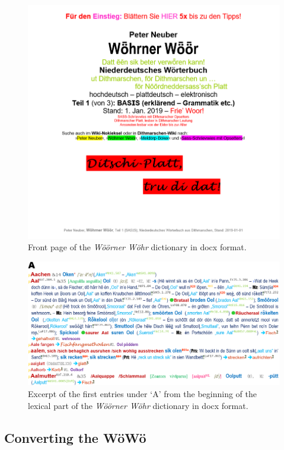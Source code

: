 \begin{figure}
    \centering
    \includegraphics[width=1\linewidth]{img/woewoe_cover.png}
    \caption{Front page of the \emph{Wöörner Wöhr} dictionary in docx format.}
    \label{fig:enter-label}
\end{figure}

\begin{figure}
    \centering
    \includegraphics[width=0.9\linewidth]{img/woewoe_excerpt-hires.png}
    \caption{Excerpt of the first entries under ‘A’ from the beginning of the lexical part of the \emph{Wöörner Wöhr} dictionary in docx format.}
    \label{fig:enter-label}
\end{figure}

\subsection{Converting the WöWö}


